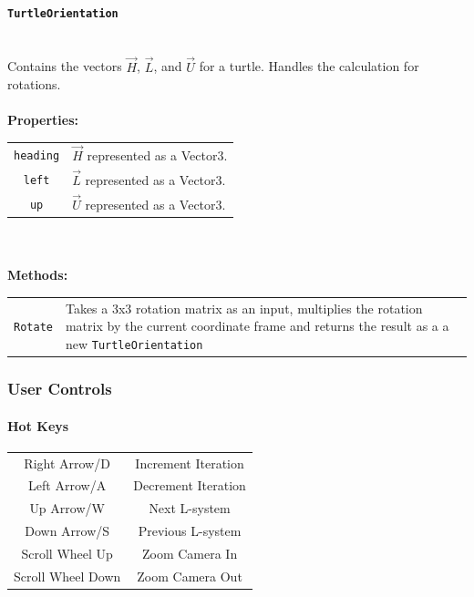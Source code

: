 \documentclass[12pt]{article}
\begin{document}
\paragraph{{\large\texttt{TurtleOrientation}}}\mbox{} \\
Contains the vectors \(\vec{H}\), \(\vec{L}\), and \(\vec{U}\) for a turtle. Handles the calculation for rotations.\\\\
\textbf{Properties: }
\begin{center}
\begin{tabular}{c p{12cm}}
\texttt{heading}& \(\vec{H}\) represented as a Vector3.\\
\texttt{left}& \(\vec{L}\) represented as a Vector3.\\
\texttt{up}& \(\vec{U}\) represented as a Vector3.\\
\end{tabular}
\end{center}\mbox{} \\\\
\textbf{Methods: }
\begin{center}
\begin{tabular}{c p{12cm}}
\texttt{Rotate}&Takes a 3x3 rotation matrix as an input, multiplies the rotation matrix by the current coordinate frame and returns the result as a a new \texttt{TurtleOrientation}\\
\end{tabular}
\end{center}


\subsubsection{User Controls}
\paragraph{Hot Keys}\mbox{}
\begin{center}
\begin{tabular}{c c}
Right Arrow/D& Increment Iteration\\
Left Arrow/A& Decrement Iteration\\
Up Arrow/W& Next L-system\\
Down Arrow/S& Previous L-system\\
Scroll Wheel Up& Zoom Camera In\\
Scroll Wheel Down&Zoom Camera Out
\end{tabular}
\end{center}
\end{document}
